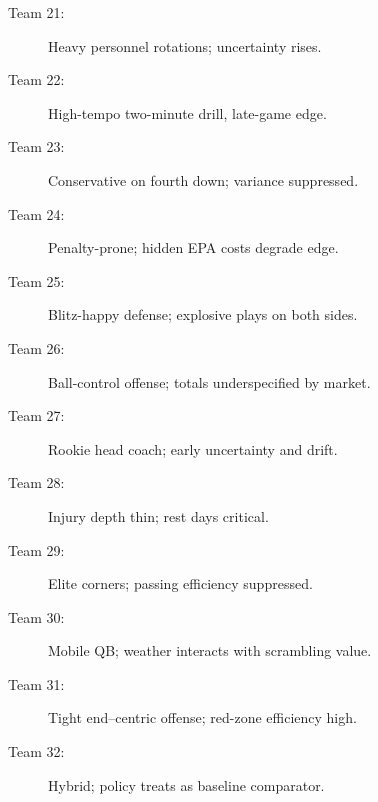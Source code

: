 \documentclass[12pt]{report}  %
\numberwithin{equation}{section}
\theoremstyle{plain}
\theoremstyle{definition}
\theoremstyle{remark}
\begin{document}
\begin{description}
  \item[Team 21:] Heavy personnel rotations; uncertainty rises.
  \item[Team 22:] High-tempo two-minute drill, late-game edge.
  \item[Team 23:] Conservative on fourth down; variance suppressed.
  \item[Team 24:] Penalty-prone; hidden EPA costs degrade edge.
  \item[Team 25:] Blitz-happy defense; explosive plays on both sides.
  \item[Team 26:] Ball-control offense; totals underspecified by market.
  \item[Team 27:] Rookie head coach; early uncertainty and drift.
  \item[Team 28:] Injury depth thin; rest days critical.
  \item[Team 29:] Elite corners; passing efficiency suppressed.
  \item[Team 30:] Mobile QB; weather interacts with scrambling value.
  \item[Team 31:] Tight end–centric offense; red-zone efficiency high.
  \item[Team 32:] Hybrid; policy treats as baseline comparator.
\end{description}

\cleardoublepage
{}
{}


\end{document}
